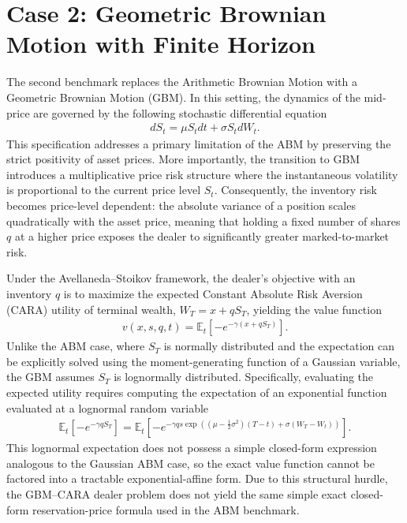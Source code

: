 \documentclass[a4paper,10pt,titlepage,oneside,openany]{book}
\theoremstyle{plain}\newtheorem{theorem}{Theorem}[chapter]
\theoremstyle{definition}\newtheorem{definition}{Definition}[chapter]
\theoremstyle{remark}\newtheorem{remark}{Remark}[chapter]
\begin{document}
\section{Case 2: Geometric Brownian Motion with Finite Horizon}

The second benchmark replaces the Arithmetic Brownian Motion with a Geometric Brownian Motion (GBM). In this setting, the dynamics of the mid-price are governed by the following stochastic differential equation
\begin{align*}
    dS_t = \mu S_t dt + \sigma S_t dW_t.
\end{align*}
This specification addresses a primary limitation of the ABM by preserving the strict positivity of asset prices. More importantly, the transition to GBM introduces a multiplicative price risk structure where the instantaneous volatility is proportional to the current price level $S_t$. Consequently, the inventory risk becomes price-level dependent: the absolute variance of a position scales quadratically with the asset price, meaning that holding a fixed number of shares $q$ at a higher price exposes the dealer to significantly greater marked-to-market risk.

Under the Avellaneda--Stoikov framework, the dealer's objective with an inventory $q$ is to maximize the expected Constant Absolute Risk Aversion (CARA) utility of terminal wealth, $W_T = x + q S_T$, yielding the value function
\begin{align*}
    v(x, s, q, t) = \mathbb{E}_t \left[ -e^{-\gamma (x + q S_T)} \right].
\end{align*}
Unlike the ABM case, where $S_T$ is normally distributed and the expectation can be explicitly solved using the moment-generating function of a Gaussian variable, the GBM assumes $S_T$ is lognormally distributed. Specifically, evaluating the expected utility requires computing the expectation of an exponential function evaluated at a lognormal random variable
\begin{align*}
    \mathbb{E}_t \left[ -e^{-\gamma q S_T} \right] = \mathbb{E}_t \left[ -e^{-\gamma q s \exp\left((\mu - \frac{1}{2}\sigma^2)(T-t) + \sigma(W_T - W_t)\right)} \right].
\end{align*}
This lognormal expectation does not possess a simple closed-form expression analogous to the Gaussian ABM case, so the exact value function cannot be factored into a tractable exponential-affine form. Due to this structural hurdle, the GBM--CARA dealer problem does not yield the same simple exact closed-form reservation-price formula used in the ABM benchmark.
\end{document}

